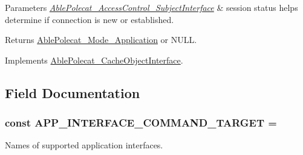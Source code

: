 \begin{DoxyParams}{Parameters}
{\em \hyperlink{interface_able_polecat___access_control___subject_interface}{Able\+Polecat\+\_\+\+Access\+Control\+\_\+\+Subject\+Interface}} & session status helps determine if connection is new or established.\\
\hline
\end{DoxyParams}
\begin{DoxyReturn}{Returns}
\hyperlink{class_able_polecat___mode___application}{Able\+Polecat\+\_\+\+Mode\+\_\+\+Application} or N\+U\+L\+L. 
\end{DoxyReturn}


Implements \hyperlink{interface_able_polecat___cache_object_interface_a3f2135f6ad45f51d075657f6d20db2cd}{Able\+Polecat\+\_\+\+Cache\+Object\+Interface}.



\subsection{Field Documentation}
\hypertarget{class_able_polecat___mode___application_a37f6c7e337e857be96a70f2e31cadae1}{}
\subsubsection[{A\+P\+P\+\_\+\+I\+N\+T\+E\+R\+F\+A\+C\+E\+\_\+\+C\+O\+M\+M\+A\+N\+D\+\_\+\+T\+A\+R\+G\+E\+T}]{\setlength{\rightskip}{0pt plus 5cm}const A\+P\+P\+\_\+\+I\+N\+T\+E\+R\+F\+A\+C\+E\+\_\+\+C\+O\+M\+M\+A\+N\+D\+\_\+\+T\+A\+R\+G\+E\+T = \textquotesingle{}}\label{class_able_polecat___mode___application_a37f6c7e337e857be96a70f2e31cadae1}
Names of supported application interfaces. \hypertarget{class_able_polecat___mode___application_a74b892c8c0b86bf9d04c5819898c51e7}{}
